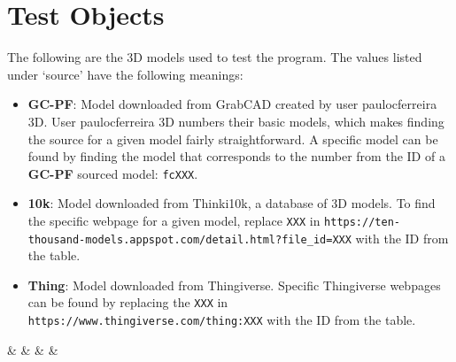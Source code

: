 \chapter{Test Objects}\label{app:model_table}

The following are the 3D models used to test the program.
The values listed under `source' have the following meanings:
\begin{itemize}
	\item \textbf{GC-PF}: Model downloaded from GrabCAD created by user paulocferreira 3D\cite{GC-PF}.
		User paulocferreira 3D numbers their basic models, which makes finding the source for a given model fairly straightforward.
		A specific model can be found by finding the model that corresponds to the number from the ID of a \textbf{GC-PF} sourced model: \verb|fcXXX|.
	\item \textbf{10k}: Model downloaded from Thinki10k, a database of 3D models\cite{Thingi10k_paper, Thingi10k_app}.
		To find the specific webpage for a given model, replace \verb|XXX| in \verb|https://ten-thousand-models.appspot.com/detail.html?file_id=XXX| with the ID from the table.
	\item \textbf{Thing}: Model downloaded from Thingiverse.
		Specific Thingiverse webpages can be found by replacing the \verb|XXX| in \verb|https://www.thingiverse.com/thing:XXX| with the ID from the table.
\end{itemize}

 {%
	\id & \src & \mesh & \class & \outcome
}%

